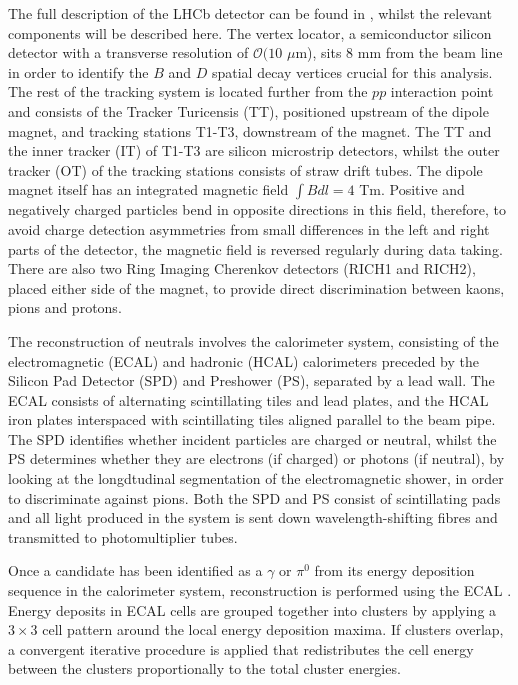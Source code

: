\documentclass[oneside,12pt]{article}
\begin{document}
The full description of the LHCb detector can be found in \cite{LHCbDetector},
whilst the relevant components will be described here.  The vertex locator, a
semiconductor silicon detector with a transverse resolution of $\mathcal{O}(10$
$\mu$m), sits $8$ mm from the beam line in order to identify the $B$ and $D$
spatial decay vertices crucial for this analysis. The rest of the tracking
system is located further from the $pp$ interaction point and consists of the
Tracker Turicensis (TT), positioned upstream of the dipole magnet, and tracking
stations T1-T3, downstream of the magnet. The TT and the inner tracker (IT) of
T1-T3 are silicon microstrip detectors, whilst the outer tracker (OT) of the
tracking stations consists of straw drift tubes. The dipole magnet itself has an
integrated magnetic field $\int B dl = 4$ Tm.  Positive and negatively charged
particles bend in opposite directions in this field, therefore, to avoid charge
detection asymmetries from small differences in the left and right parts of the
detector, the magnetic field is reversed regularly during data taking.  There
are also two Ring Imaging Cherenkov detectors (RICH1 and RICH2), placed either
side of the magnet, to provide direct discrimination between kaons, pions and
protons.

The reconstruction of neutrals involves the calorimeter system, consisting of
the electromagnetic (ECAL) and hadronic (HCAL) calorimeters preceded by the
Silicon Pad Detector (SPD) and Preshower (PS), separated by a lead wall. The
ECAL consists of alternating scintillating tiles and lead plates, and the HCAL
iron plates interspaced with scintillating tiles aligned parallel to the beam
pipe. The SPD identifies whether incident particles are charged or neutral,
whilst the PS determines whether they are electrons (if charged) or photons (if
neutral), by looking at the longdtudinal segmentation of the electromagnetic
shower, in order to discriminate against pions. Both the SPD and PS consist of
scintillating pads and all light produced in the system is sent down
wavelength-shifting fibres and transmitted to photomultiplier tubes.

Once a candidate has been identified as a $\gamma$ or $\pi^0$ from its energy
deposition sequence in the calorimeter system, reconstruction is performed using
the ECAL \cite{NeutralReconstruction}. Energy deposits in ECAL cells are grouped
together into clusters by applying a $3\times3$ cell pattern around the local
energy deposition maxima. If clusters overlap, a convergent iterative procedure
is applied that redistributes the cell energy between the clusters
proportionally to the total cluster energies.
\end{document}
